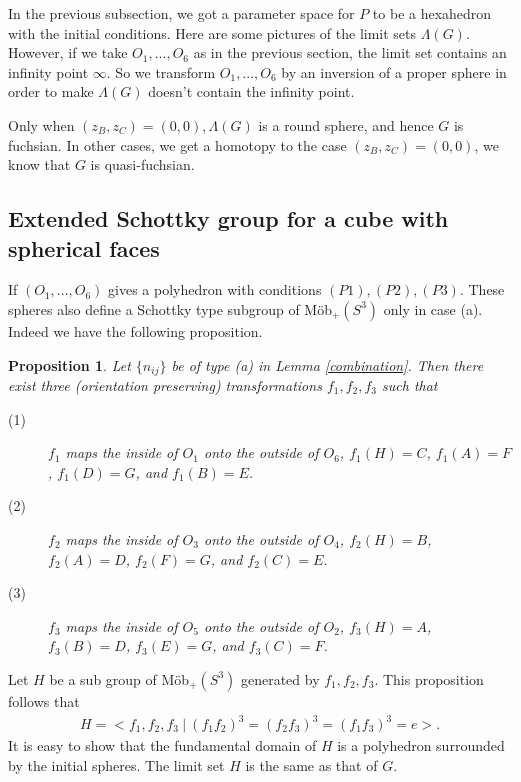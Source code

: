 \documentclass[suppldata, dvipdfmx]{interact}
\theoremstyle{plain}%
\newtheorem{proposition}[theorem]{Proposition}
\theoremstyle{definition}
\theoremstyle{remark}
\theoremstyle{problemstyle}
\begin{document}
In the previous subsection, we got a parameter space for $P$ to be a
hexahedron with the initial conditions. Here are some pictures of the
limit sets $\Lambda(G)$. However, if we take $O_1, ..., O_6$ as in the
previous section, the limit set contains an infinity point $\infty$. So
we transform $O_1, ..., O_6$ by an inversion of a proper sphere in
order to make $\Lambda(G)$ doesn't contain the infinity point.

Only when $(z_B, z_C) =(0, 0), \Lambda(G)$ is a round sphere, and hence
$G$ is fuchsian. In other cases, we get a homotopy to the case 
$(z_B, z_C) = (0, 0)$, we know that $G$ is quasi-fuchsian.

\subsection{Extended Schottky group for a cube with spherical faces}\label{extend}
If $(O_1, ..., O_6)$ gives a polyhedron with conditions
$(P1), (P2), (P3)$.
These spheres also define a Schottky type subgroup of M\"ob$_+(S^3)$ 
only in case (a). Indeed we have the following  proposition.

\begin{proposition}
Let $\{n_{ij}\}$ be of type (a) in Lemma \ref{combination}. Then there exist three
 (orientation preserving) transformations $f_1, f_2, f_3$ such that
 \begin{description}
  \item[(1)] $f_1$ maps the inside of $O_1$ onto the outside of
             $O_6$, $f_1(H) = C$, $f_1(A) = F$,  $f_1(D) = G$, and
             $f_1(B) = E$.
  \item[(2)] $f_2$ maps the inside of $O_3$ onto the outside of
             $O_4$, $f_2(H) = B$, $f_2(A) = D$,  $f_2(F) = G$, and
             $f_2(C) = E$.             
  \item[(3)] $f_3$ maps the inside of $O_5$ onto the outside of
             $O_2$, $f_3(H) = A$, $f_3(B) = D$,  $f_3(E) = G$, and
             $f_3(C) = F$.
\end{description}
\end{proposition}

Let $H$ be a sub group of M\"ob$_+(S^3)$ generated by $f_1, f_2,
f_3$. This proposition follows that
\begin{align*}
 H = <f_1, f_2, f_3~|~(f_1f_2)^3 = (f_2f_3)^3 = (f_1f_3)^3 = e>.
\end{align*}
It is easy to show that the fundamental domain of $H$ is a polyhedron
surrounded by the initial spheres. The limit set $H$ is the same as that
of $G$.
\end{document}
